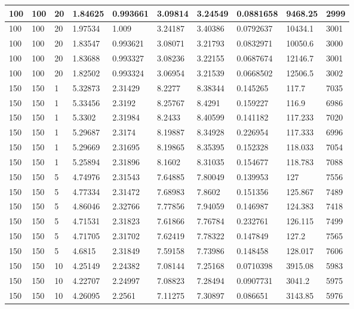\begin{landscape}
\begin{longtable}{ | l | l | l | l | l | l | l | l | l | l | }
100 & 100 & 20 & 1.84625 & 0.993661 & 3.09814 & 3.24549 & 0.0881658 & 9468.25 & 2999\\ \hline
100 & 100 & 20 & 1.97534 & 1.009 & 3.24187 & 3.40386 & 0.0792637 & 10434.1 & 3001\\ \hline
100 & 100 & 20 & 1.83547 & 0.993621 & 3.08071 & 3.21793 & 0.0832971 & 10050.6 & 3000\\ \hline
100 & 100 & 20 & 1.83688 & 0.993327 & 3.08236 & 3.22155 & 0.0687674 & 12146.7 & 3001\\ \hline
100 & 100 & 20 & 1.82502 & 0.993324 & 3.06954 & 3.21539 & 0.0668502 & 12506.5 & 3002\\ \hline
150 & 150 & 1 & 5.32873 & 2.31429 & 8.2277 & 8.38344 & 0.145265 & 117.7 & 7035\\ \hline
150 & 150 & 1 & 5.33456 & 2.3192 & 8.25767 & 8.4291 & 0.159227 & 116.9 & 6986\\ \hline
150 & 150 & 1 & 5.3302 & 2.31984 & 8.2433 & 8.40599 & 0.141182 & 117.233 & 7020\\ \hline
150 & 150 & 1 & 5.29687 & 2.3174 & 8.19887 & 8.34928 & 0.226954 & 117.333 & 6996\\ \hline
150 & 150 & 1 & 5.29669 & 2.31695 & 8.19865 & 8.35395 & 0.152328 & 118.033 & 7054\\ \hline
150 & 150 & 1 & 5.25894 & 2.31896 & 8.1602 & 8.31035 & 0.154677 & 118.783 & 7088\\ \hline
150 & 150 & 5 & 4.74976 & 2.31543 & 7.64885 & 7.80049 & 0.139953 & 127 & 7556\\ \hline
150 & 150 & 5 & 4.77334 & 2.31472 & 7.68983 & 7.8602 & 0.151356 & 125.867 & 7489\\ \hline
150 & 150 & 5 & 4.86046 & 2.32766 & 7.77856 & 7.94059 & 0.146987 & 124.383 & 7418\\ \hline
150 & 150 & 5 & 4.71531 & 2.31823 & 7.61866 & 7.76784 & 0.232761 & 126.115 & 7499\\ \hline
150 & 150 & 5 & 4.71705 & 2.31702 & 7.62419 & 7.78322 & 0.147849 & 127.2 & 7565\\ \hline
150 & 150 & 5 & 4.6815 & 2.31849 & 7.59158 & 7.73986 & 0.148458 & 128.017 & 7606\\ \hline
150 & 150 & 10 & 4.25149 & 2.24382 & 7.08144 & 7.25168 & 0.0710398 & 3915.08 & 5983\\ \hline
150 & 150 & 10 & 4.22707 & 2.24997 & 7.08823 & 7.28494 & 0.0907731 & 3041.2 & 5975\\ \hline
150 & 150 & 10 & 4.26095 & 2.2561 & 7.11275 & 7.30897 & 0.086651 & 3143.85 & 5976\\ \hline

\end{longtable}
\end{landscape}
